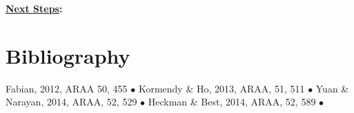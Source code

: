 \medskip
\medskip
\smallskip
\smallskip
\noindent
{\bf \underline{Next Steps}:}

\section{Bibliography}
Fabian, 2012, ARAA 50, 455 $\bullet$ 
Kormendy \& Ho, 2013, ARAA, 51, 511 $\bullet$
Yuan \& Narayan, 2014, ARAA, 52, 529 $\bullet$
Heckman \& Best, 2014, ARAA, 52, 589  $\bullet$



\clearpage


